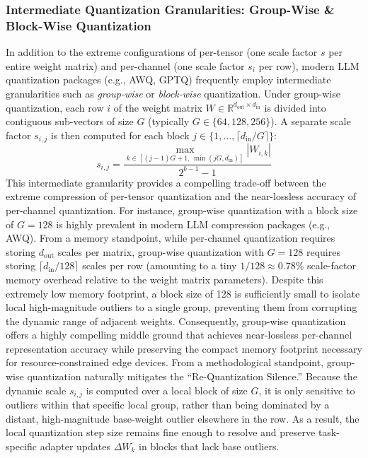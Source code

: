 \subsubsection{Intermediate Quantization Granularities: Group-Wise \& Block-Wise Quantization}
In addition to the extreme configurations of per-tensor (one scale factor $s$ per entire weight matrix) and per-channel (one scale factor $s_i$ per row), modern LLM quantization packages (e.g., AWQ, GPTQ) frequently employ intermediate granularities such as \emph{group-wise} or \emph{block-wise} quantization. 
Under group-wise quantization, each row $i$ of the weight matrix $W \in \mathbb{R}^{d_{\text{out}} \times d_{\text{in}}}$ is divided into contiguous sub-vectors of size $G$ (typically $G \in \{64, 128, 256\}$). A separate scale factor $s_{i,j}$ is then computed for each block $j \in \{1, \dots, \lceil d_{\text{in}} / G \rceil\}$:
\begin{equation}
  s_{i,j} = \frac{\max_{k \in [(j-1)G+1, \, \min(jG, d_{\text{in}})]} |W_{i,k}|}{2^{b-1} - 1}
\end{equation}
This intermediate granularity provides a compelling trade-off between the extreme compression of per-tensor quantization and the near-lossless accuracy of per-channel quantization. For instance, group-wise quantization with a block size of $G=128$ is highly prevalent in modern LLM compression packages (e.g., AWQ). From a memory standpoint, while per-channel quantization requires storing $d_{\text{out}}$ scales per matrix, group-wise quantization with $G=128$ requires storing $\lceil d_{\text{in}} / 128 \rceil$ scales per row (amounting to a tiny $1/128 \approx 0.78\%$ scale-factor memory overhead relative to the weight matrix parameters). Despite this extremely low memory footprint, a block size of 128 is sufficiently small to isolate local high-magnitude outliers to a single group, preventing them from corrupting the dynamic range of adjacent weights. Consequently, group-wise quantization offers a highly compelling middle ground that achieves near-lossless per-channel representation accuracy while preserving the compact memory footprint necessary for resource-constrained edge devices.
From a methodological standpoint, group-wise quantization naturally mitigates the ``Re-Quantization Silence.'' Because the dynamic scale $s_{i,j}$ is computed over a local block of size $G$, it is only sensitive to outliers within that specific local group, rather than being dominated by a distant, high-magnitude base-weight outlier elsewhere in the row. As a result, the local quantization step size remains fine enough to resolve and preserve task-specific adapter updates $\Delta W_k$ in blocks that lack base outliers. 

